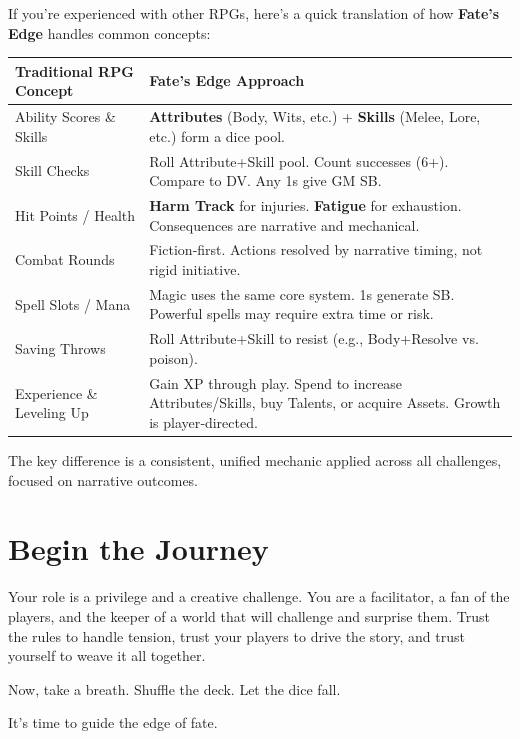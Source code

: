 \begin{tcolorbox}[enhanced, sharp corners, boxrule=1pt, colback=blue!5!white, colframe=blue!75!black, title={A Guide for Veterans: Fate's Edge in a Nutshell}]
If you’re experienced with other RPGs, here’s a quick translation of how \textbf{Fate's Edge} handles common concepts:

\begin{center}
\begin{tabular}{|p{6cm}|p{6cm}|}
\hline
\textbf{Traditional RPG Concept} & \textbf{Fate's Edge Approach} \\
\hline
Ability Scores \& Skills & \textbf{Attributes} (Body, Wits, etc.) + \textbf{Skills} (Melee, Lore, etc.) form a dice pool. \\
\hline
Skill Checks & Roll Attribute+Skill pool. Count successes (6+). Compare to DV. Any 1s give GM SB. \\
\hline
Hit Points / Health & \textbf{Harm Track} for injuries. \textbf{Fatigue} for exhaustion. Consequences are narrative and mechanical. \\
\hline
Combat Rounds & Fiction‑first. Actions resolved by narrative timing, not rigid initiative. \\
\hline
Spell Slots / Mana & Magic uses the same core system. 1s generate SB. Powerful spells may require extra time or risk. \\
\hline
Saving Throws & Roll Attribute+Skill to resist (e.g., Body+Resolve vs. poison). \\
\hline
Experience \& Leveling Up & Gain XP through play. Spend to increase Attributes/Skills, buy Talents, or acquire Assets. Growth is player‑directed. \\
\hline
\end{tabular}
\end{center}

The key difference is a consistent, unified mechanic applied across all challenges, focused on narrative outcomes.
\end{tcolorbox}

\section{Begin the Journey}
\label{sec:gm-begin}

Your role is a privilege and a creative challenge. You are a facilitator, a fan of the players, and the keeper of a world that will challenge and surprise them. Trust the rules to handle tension, trust your players to drive the story, and trust yourself to weave it all together.

Now, take a breath. Shuffle the deck. Let the dice fall.

It’s time to guide the edge of fate.